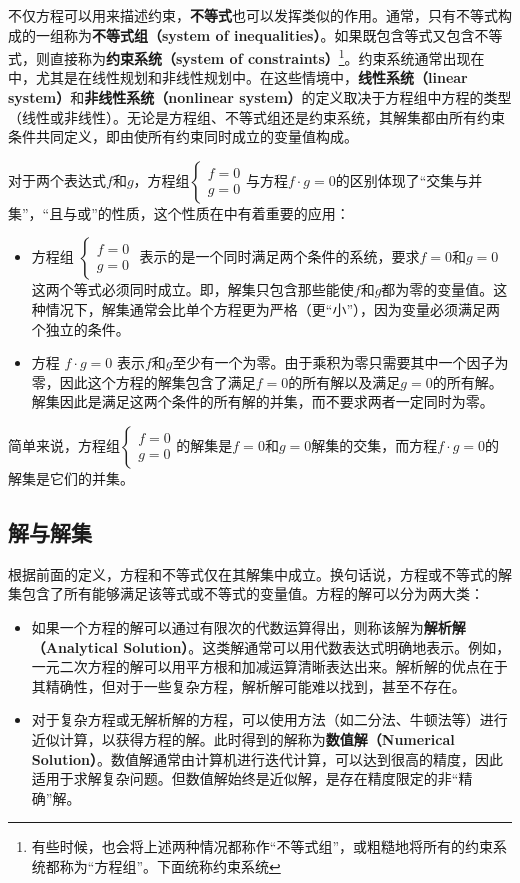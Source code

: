 不仅方程可以用来描述约束，\textbf{不等式}也可以发挥类似的作用。通常，只有不等式构成的一组称为\textbf{不等式组（system of inequalities）}。如果既包含等式又包含不等式，则直接称为\textbf{约束系统（system of constraints）}\footnote{有些时候，也会将上述两种情况都称作“不等式组”，或粗糙地将所有的约束系统都称为“方程组”。下面统称约束系统}。约束系统通常出现在中，尤其是在线性规划和非线性规划中。在这些情境中，\textbf{线性系统（linear system）}和\textbf{非线性系统（nonlinear system）}的定义取决于方程组中方程的类型（线性或非线性）。无论是方程组、不等式组还是约束系统，其解集都由所有约束条件共同定义，即由使所有约束同时成立的变量值构成。

对于两个表达式$f$和$g$，方程组$\begin{cases}f = 0 \\ g = 0\end{cases}$与方程$f \cdot g = 0$的区别体现了“交集与并集”，“且与或”的性质，这个性质在中有着重要的应用：

\begin{itemize}
\item 方程组 $\begin{cases}f = 0 \\ g = 0\end{cases}$ 表示的是一个同时满足两个条件的系统，要求$f = 0$和$g = 0$这两个等式必须同时成立。即，解集只包含那些能使$f$和$g$都为零的变量值。这种情况下，解集通常会比单个方程更为严格（更“小”），因为变量必须满足两个独立的条件。
\item 方程 $f \cdot g = 0$ 表示$f$和$g$至少有一个为零。由于乘积为零只需要其中一个因子为零，因此这个方程的解集包含了满足$f = 0$的所有解以及满足$g = 0$的所有解。解集因此是满足这两个条件的所有解的并集，而不要求两者一定同时为零。
\end{itemize}

简单来说，方程组$\begin{cases}f = 0 \\ g = 0\end{cases}$的解集是$f = 0$和$g = 0$解集的交集，而方程$f \cdot g = 0$的解集是它们的并集。

\subsection{解与解集}

根据前面的定义，方程和不等式仅在其解集中成立。换句话说，方程或不等式的解集包含了所有能够满足该等式或不等式的变量值。方程的解可以分为两大类：

\begin{itemize}
\item 如果一个方程的解可以通过有限次的代数运算得出，则称该解为\textbf{解析解（Analytical Solution）}。这类解通常可以用代数表达式明确地表示。例如，一元二次方程的解可以用平方根和加减运算清晰表达出来。解析解的优点在于其精确性，但对于一些复杂方程，解析解可能难以找到，甚至不存在。
\item 对于复杂方程或无解析解的方程，可以使用方法（如二分法、牛顿法等）进行近似计算，以获得方程的解。此时得到的解称为\textbf{数值解（Numerical Solution）}。数值解通常由计算机进行迭代计算，可以达到很高的精度，因此适用于求解复杂问题。但数值解始终是近似解，是存在精度限定的非“精确”解。
\end{itemize}

